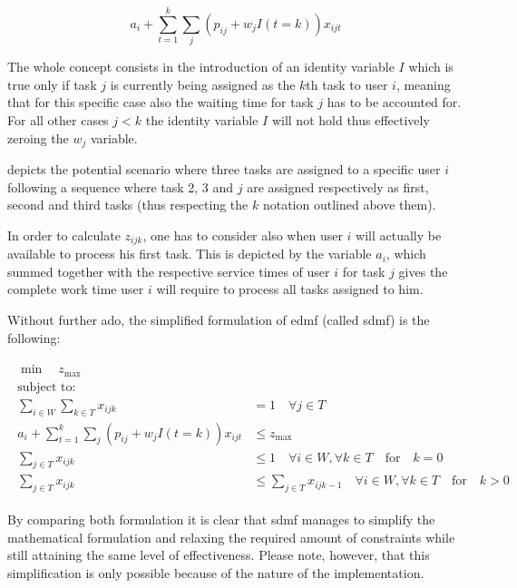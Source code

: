 \begin{equation}
\label{eq:simplified_z_with_k}
	a_i + \sum_{t=1}^k \sum_j (p_{ij} + w_j I(t=k))x_{ijt}
\end{equation}

The whole concept consists in the introduction of an identity variable $I$ which is true only if task $j$ is currently being assigned as the $k$th task to user $i$, meaning that for this specific case also the waiting time for task $j$ has to be accounted for. For all other cases \ie $j<k$ the identity variable $I$ will not hold thus effectively zeroing the $w_j$ variable.

 depicts the potential scenario where three tasks are assigned to a specific user $i$ following a sequence where task 2, 3 and $j$ are assigned respectively as first, second and third tasks (thus respecting the $k$ notation outlined above them).

In order to calculate $z_{ijk}$, one has to consider also when user $i$ will actually be available to process his first task. This is depicted by the variable $a_i$, which summed together with the respective service times of user $i$ for task $j$ gives the complete work time user $i$ will require to process all tasks assigned to him.


Without further ado, the simplified formulation of \gls{edmf} (called \gls{sdmf}) is the following:

\begin{align}
	\begin{split}
	    \min \quad z_{\text{max}}\\
	    \text{subject to:} \\
	    \sum_{i \in W} \sum_{k \in T} x_{ijk} &= 1 \quad \forall j \in T\\
	    a_i + \sum_{t=1}^k \sum_j (p_{ij} + w_j I(t=k))x_{ijt} &\leq z_{\text{max}}\\
	    \sum_{j \in T} x_{ijk} &\leq 1 \quad \forall i \in W, \forall k \in T \quad \text{for} \quad k=0\\
	    \sum_{j \in T} x_{ijk} &\leq \sum_{j \in T} x_{ijk-1} \quad \forall i \in W, \forall k \in T \quad \text{for} \quad k>0
	\end{split}
\end{align}

By comparing both formulation it is clear that \gls{sdmf} manages to simplify the mathematical formulation and relaxing the required amount of constraints while still attaining the same level of effectiveness. Please note, however, that this simplification is only possible because of the nature of the implementation.

